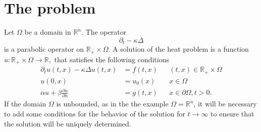 %
%
%
\section{The problem}
Let $\Omega$ be a domain in $\mathbb R^n$.
The operator
\[
\partial_t-\kappa\Delta
\]
is a parabolic operator on $\mathbb R_+\times\Omega$.
A solution of the heat problem is a function
$u\colon\mathbb R_+\times\Omega\to\mathbb R,$
that satisfies the following conditions
\begin{align*}
\partial_tu(t,x)-\kappa\Delta u(t,x)&=f(t,x)&&(t,x)\in\mathbb R_+\times\Omega
\\
u(0,x)&=u_0(x)&&x\in\Omega
\\
\alpha u+\beta\frac{\partial u}{\partial n}&=g(t, x)&&x\in\partial\Omega, t>0.
\end{align*}
If the domain $\Omega$ is unbounded, as in the the example $\Omega=\mathbb R^n$,
it will be necessary to add some conditions for the behavior of the
solution for $t\to\infty$ to ensure that the solution will be 
uniquely determined.

